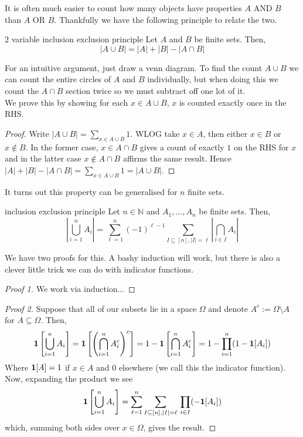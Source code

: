 \documentclass{article}
\newcounter{statementcount}
\begin{document}
\setcounter{statementcount}{1}

It is often much easier to count how many objects have properties $A$ AND $B$ than $A$ OR $B$. Thankfully we have the following principle to 
relate the two.

\begin{proposition}[]{2 variable inclusion exclusion principle}
    Let $A$ and $B$ be finite sets. Then, 
    \[|A \cup B| = |A| + |B| - |A \cap B|\]    
\end{proposition}

For an intuitive argument, just draw a venn diagram. To find the count $A \cup B$ we can count the entire circles
of $A$ and $B$ individually, but when doing this we count the $A \cap B$ section twice so we must subtract off one 
lot of it. \\

We prove this by showing for each $x \in A \cup B$, $x$ is counted exactly once in the RHS. 

\begin{proof}
    Write $|A \cup B| = \sum_{x \in A \cup B}1$.  WLOG take $x \in A$, then either $x \in B$ or $x \not\in B$. In the former 
    case, $x \in A \cap B$ gives a count of exactly $1$ on the RHS for $x$ and in the latter case $x \not\in A \cap B$ 
    affirms the same result. Hence $|A| + |B| - |A \cap B| = \sum_{x \in A \cup B}1 = |A \cup B|$. 
\end{proof}

It turns out this property can be generalised for $n$ finite sets.

\begin{theorem}[]{inclusion exclusion principle}
    Let $n \in \mathbb{N}$ and $A_1, \dots, A_n$ be finite sets. Then, 
    \[\left|\bigcup_{i=1}^n A_i\right| = \sum_{\ell = 1}^n (-1)^{\ell-1}\sum_{I \subseteq [n], |I| = \ell} \left|\bigcap_{i \in I}A_i\right|\]
\end{theorem}

We have two proofs for this. A bashy induction will work, but there is also a clever little trick we can do with indicator functions. 

\begin{proof}[Proof 1]
    We work via induction$\dots$
\end{proof}

\begin{proof}[Proof 2]
    Suppose that all of our subsets lie in a space $\Omega$ and denote $A^c := \Omega \setminus A$ for $A \subseteq \Omega$. Then, 
    \[{\bf 1}\left[\bigcup_{i=1}^n A_i\right] = {\bf 1}\left[\left(\bigcap_{i=1}^n A_i^c\right)^c\right]
    = 1 - {\bf 1}\left[\bigcap_{i=1}^n A_i^c\right] = 1 - \prod_{i=1}^n (1 - {\bf 1}[A_i])\]
    Where ${\bf 1}[A] = 1$ if $x \in A$ and $0$ elsewhere (we call this the indicator function). Now, expanding the 
    product we see 
    \[{\bf 1}\left[\bigcup_{i=1}^n A_i\right] 
    = \sum_{\ell = 1}^n \sum_{I \subseteq [n], \\ |I| = \ell} \, \prod_{i \in I} (- {\bf 1}[A_i])\] 
    which, summing both sides over $x \in \Omega$, gives the result.
\end{proof}
\end{document}
